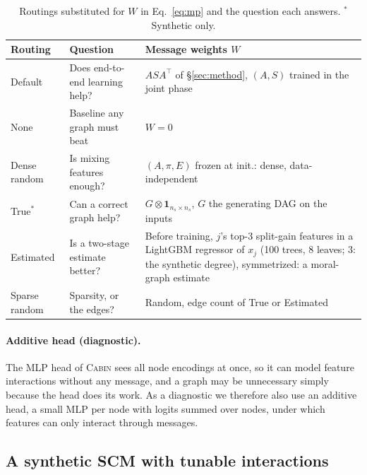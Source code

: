 \documentclass[anon,12pt]{clear2027} %
\newcommand{\Cabin}{\textsc{Cabin}}
\newcommand{\T}{^{\top}}
\begin{document}
\begin{table}[t]
\centering
\caption{Routings substituted for $W$ in Eq.~\eqref{eq:mp} and the question each answers. $^\ast$Synthetic only.}
\label{tab:routings}
\small
\begin{tabular}{@{}>{\raggedright}p{2.25cm}>{\raggedright}p{4.6cm}>{\raggedright\arraybackslash}p{7.45cm}@{}}
\toprule
Routing & Question & Message weights $W$ \\
\midrule
Default & Does end-to-end learning help? & $ASA\T$ of \S\ref{sec:method}, $(A,S)$ trained in the joint phase \\
None & Baseline any graph must beat & $W=0$ \\
Dense random & Is mixing features enough? & $(A,\pi,E)$ frozen at init.: dense, data-independent \\
True$^\ast$ & Can a correct graph help? & $G\otimes\mathbf{1}_{n_s\times n_s}$, $G$ the generating DAG on the inputs \\
Estimated & Is a two-stage estimate better? & Before training, $j$'s top-3 split-gain features in a LightGBM \citep{ke2017lightgbm} regressor of $x_j$ (100 trees, 8 leaves; 3: the synthetic degree), symmetrized: a moral-graph estimate \\
Sparse random & Sparsity, or the edges? & Random, edge count of True or Estimated \\
\bottomrule
\end{tabular}
\end{table}

\paragraph{Additive head (diagnostic).} The MLP head of \Cabin{} sees all node encodings at once, so it can model feature interactions without any message, and a graph may be unnecessary simply because the head does its work. As a diagnostic we therefore also use an additive head, a small MLP per node with logits summed over nodes, under which features can only interact through messages.

\subsection{A synthetic SCM with tunable interactions}
\label{sec:when-synth}
\end{document}
